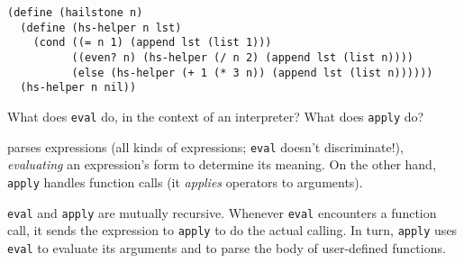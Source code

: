 \documentclass[twoside]{article}
\newcommand{\solution}[1]{{\color{red}#1}}
\begin{document}
\begin{enumerate}

\begin{lstlisting}
(define (hailstone n)
  (define (hs-helper n lst)
    (cond ((= n 1) (append lst (list 1)))
          ((even? n) (hs-helper (/ n 2) (append lst (list n))))
          (else (hs-helper (+ 1 (* 3 n)) (append lst (list n))))))
  (hs-helper n nil))
\end{lstlisting}


What does {\tt eval} do, in the context of an interpreter? What does {\tt apply} do?

\solution{{\tt eval} parses expressions (all kinds of expressions; {\tt eval} doesn't discriminate!), \emph{evaluating} an expression's form to determine its meaning. On the other hand, {\tt apply} handles function calls (it \emph{applies} operators to arguments).

{\tt eval} and {\tt apply} are mutually recursive. Whenever {\tt eval} encounters a function call, it sends the expression to {\tt apply} to do the actual calling. In turn, {\tt apply} uses {\tt eval} to evaluate its arguments and to parse the body of user-defined functions.}

\end{enumerate}
\end{document}
